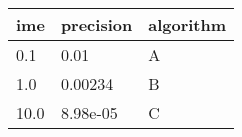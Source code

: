\begin{longtable}[]{@{}lll@{}}
\toprule
ime & precision & algorithm\tabularnewline
\midrule
\endhead
0.1 & 0.01 & A\tabularnewline
1.0 & 0.00234 & B\tabularnewline
10.0 & 8.98e-05 & C\tabularnewline
\bottomrule
\end{longtable}
